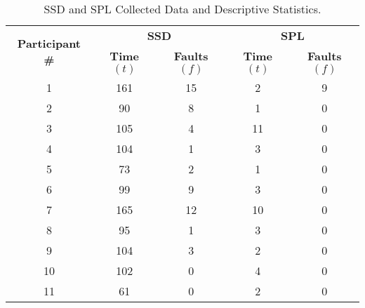 \begin{table}
\caption{\label{tab:resul1}SSD and SPL Collected Data and Descriptive Statistics.}
    \centering
    \scriptsize
\begin{tabular}{c|c|c|c|c}
\hline
\multirow{2}{*}{\textbf{Participant \#}} & \multicolumn{2}{c|}{\textbf{SSD}} & \multicolumn{2}{c}{\textbf{SPL}}  \\ \cline{2-5}
                                    & \textbf{Time $(t)$}   & \textbf{Faults $(f)$} & \textbf{Time $(t)$}  & \textbf{Faults $(f)$}                                  \\ \hline
1                                   & 161             & 15              & 2              & 9                                              \\ \hline
2                                   & 90              & 8               & 1              & 0                                             \\ \hline
3                                   & 105             & 4               & 11             & 0                                              \\ \hline
4                                   & 104             & 1               & 3              & 0                                             \\ \hline
5                                   & 73              & 2               & 1              & 0                                             \\ \hline
6                                   & 99              & 9               & 3              & 0                                              \\ \hline
7                                   & 165             & 12              & 10             & 0                                              \\ \hline
8                                   & 95              & 1               & 3              & 0                                              \\ \hline
9                                   & 104             & 3               & 2              & 0                                               \\ \hline
10                                  & 102             & 0               & 4              & 0                                              \\ \hline
11                                  & 61              & 0               & 2              & 0                                             \\ \hline

\end{tabular}
\end{table}
